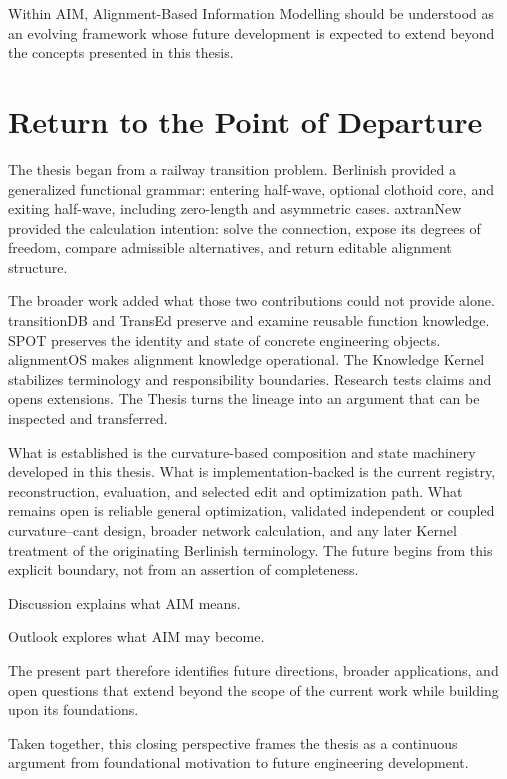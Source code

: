 \begin{principle}
\label{princ:open-framework-principle}
Within AIM, Alignment-Based Information Modelling should be understood
as an evolving framework whose future development is expected to extend
beyond the concepts presented in this thesis.
\end{principle}

\section*{Return to the Point of Departure}

The thesis began from a railway transition problem. Berlinish provided a
generalized functional grammar: entering half-wave, optional clothoid core,
and exiting half-wave, including zero-length and asymmetric cases. axtranNew
provided the calculation intention: solve the connection, expose its degrees
of freedom, compare admissible alternatives, and return editable alignment
structure.

The broader work added what those two contributions could not provide alone.
transitionDB and TransEd preserve and examine reusable function knowledge.
SPOT preserves the identity and state of concrete engineering objects.
alignmentOS makes alignment knowledge operational. The Knowledge Kernel
stabilizes terminology and responsibility boundaries. Research tests claims
and opens extensions. The Thesis turns the lineage into an argument that can
be inspected and transferred.

What is established is the curvature-based composition and state machinery
developed in this thesis. What is implementation-backed is the current
registry, reconstruction, evaluation, and selected edit and optimization path.
What remains open is reliable general optimization, validated independent or
coupled curvature--cant design, broader network calculation, and any later
Kernel treatment of the originating Berlinish terminology. The future begins
from this explicit boundary, not from an assertion of completeness.

\begin{summary}
Discussion explains what AIM means.

Outlook explores what AIM may become.

The present part therefore identifies future directions, broader
applications, and open questions that extend beyond the scope of the
current work while building upon its foundations.
\end{summary}

Taken together, this closing perspective frames the thesis as a
continuous argument from foundational motivation to future engineering
development.
